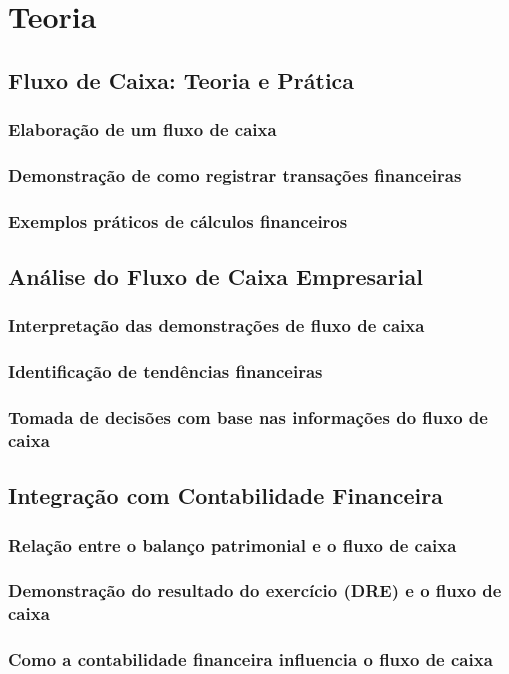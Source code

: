 \chapter{Teoria}\label{chp:theory}
\thispagestyle{headings}


\section{Fluxo de Caixa: Teoria e Prática}

\subsection{Elaboração de um fluxo de caixa}
\subsection{Demonstração de como registrar transações financeiras}
\subsection{Exemplos práticos de cálculos financeiros}

\section{Análise do Fluxo de Caixa Empresarial}

\subsection{Interpretação das demonstrações de fluxo de caixa}
\subsection{Identificação de tendências financeiras}
\subsection{Tomada de decisões com base nas informações do fluxo de caixa}

\section{Integração com Contabilidade Financeira}

\subsection{Relação entre o balanço patrimonial e o fluxo de caixa}
\subsection{Demonstração do resultado do exercício (DRE) e o fluxo de caixa}
\subsection{Como a contabilidade financeira influencia o fluxo de caixa}